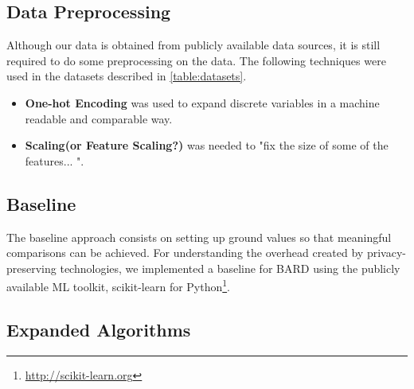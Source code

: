 \subsection{Data Preprocessing}
\label{subsec:DataPreProcessingImplementation}

Although our data is obtained from publicly available data sources, it is still required to do some preprocessing on the data. The following techniques were used in the datasets described in \ref{table:datasets}.

\begin{itemize}
    \setlength\itemsep{1em}

	\item\textbf{One-hot Encoding}\cite{harris2010digital} was used to expand discrete variables in a machine readable and comparable way. 

	\item\textbf{Scaling(or Feature Scaling?)} was needed to "fix the size of some of the features... ".
\end{itemize}






\subsection{Baseline}
\label{subsec:BaselineImplementation}

The baseline approach consists on setting up ground values so that meaningful comparisons can be achieved. For understanding the overhead created by privacy-preserving technologies, we implemented a baseline for \ac{BARD} using the publicly available \ac{ML} toolkit, scikit-learn for Python\footnote{\url{http://scikit-learn.org}}.






\subsection{Expanded Algorithms}
\label{subsec:ExpandedAlgorithmsImplementation}


